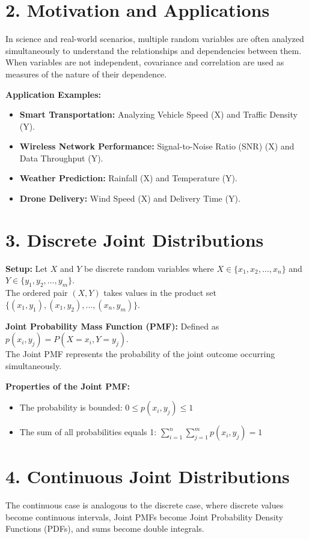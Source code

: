 \documentclass[12pt]{article}
\begin{document}
\newpage

\section{2. Motivation and Applications}
In science and real-world scenarios, multiple random variables are often analyzed simultaneously to understand the relationships and dependencies between them. \\
When variables are not independent, covariance and correlation are used as measures of the nature of their dependence.

\noindent
\textbf{Application Examples:}
\begin{itemize}[noitemsep]
    \item \textbf{Smart Transportation:} Analyzing Vehicle Speed (X) and Traffic Density (Y).
    \item \textbf{Wireless Network Performance:} Signal-to-Noise Ratio (SNR) (X) and Data Throughput (Y).
    \item \textbf{Weather Prediction:} Rainfall (X) and Temperature (Y).
    \item \textbf{Drone Delivery:} Wind Speed (X) and Delivery Time (Y).
\end{itemize}

\section{3. Discrete Joint Distributions}
\textbf{Setup:} Let $X$ and $Y$ be discrete random variables where $X \in \{x_1, x_2, \dots, x_n\}$ and $Y \in \{y_1, y_2, \dots, y_m\}$. \\
The ordered pair $(X, Y)$ takes values in the product set $\{(x_1, y_1), (x_1, y_2), \dots, (x_n, y_m)\}$.

\noindent
\textbf{Joint Probability Mass Function (PMF):} Defined as $p(x_i, y_j) = P(X = x_i, Y = y_j)$. \\
The Joint PMF represents the probability of the joint outcome occurring simultaneously.

\noindent
\textbf{Properties of the Joint PMF:}
\begin{itemize}
    \item The probability is bounded: $0 \le p(x_i, y_j) \le 1$
    \item The sum of all probabilities equals 1: $\sum_{i=1}^{n}\sum_{j=1}^{m} p(x_i, y_j) = 1$
\end{itemize}

\section{4. Continuous Joint Distributions}
The continuous case is analogous to the discrete case, where discrete values become continuous intervals, Joint PMFs become Joint Probability Density Functions (PDFs), and sums become double integrals.
\end{document}
